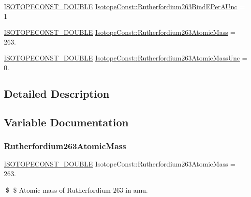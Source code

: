 \begin{DoxyCompactItemize}
\item 
\mbox{\hyperlink{group___isotope_const-_macros_ga8f45a7272ce02c0b4c65c44636ed719a}{I\+S\+O\+T\+O\+P\+E\+C\+O\+N\+S\+T\+\_\+\+D\+O\+U\+B\+LE}} \mbox{\hyperlink{group___isotope_const-_rutherfordium-_rf263_ga2b7370f06ca52f498ba7cba76658a5df}{Isotope\+Const\+::\+Rutherfordium263\+Bind\+E\+Per\+A\+Unc}} = 1
\item 
\mbox{\hyperlink{group___isotope_const-_macros_ga8f45a7272ce02c0b4c65c44636ed719a}{I\+S\+O\+T\+O\+P\+E\+C\+O\+N\+S\+T\+\_\+\+D\+O\+U\+B\+LE}} \mbox{\hyperlink{group___isotope_const-_rutherfordium-_rf263_ga6a90963a65b14347b4a79618be3d50c0}{Isotope\+Const\+::\+Rutherfordium263\+Atomic\+Mass}} = 263.
\item 
\mbox{\hyperlink{group___isotope_const-_macros_ga8f45a7272ce02c0b4c65c44636ed719a}{I\+S\+O\+T\+O\+P\+E\+C\+O\+N\+S\+T\+\_\+\+D\+O\+U\+B\+LE}} \mbox{\hyperlink{group___isotope_const-_rutherfordium-_rf263_ga54254646a83fdb500201ae9f2af0cd1a}{Isotope\+Const\+::\+Rutherfordium263\+Atomic\+Mass\+Unc}} = 0.
\end{DoxyCompactItemize}


\subsection{Detailed Description}


\subsection{Variable Documentation}
\mbox{\label{group___isotope_const-_rutherfordium-_rf263_ga6a90963a65b14347b4a79618be3d50c0}} 
\subsubsection{\texorpdfstring{Rutherfordium263\+Atomic\+Mass}{Rutherfordium263AtomicMass}}
{\footnotesize\ttfamily \mbox{\hyperlink{group___isotope_const-_macros_ga8f45a7272ce02c0b4c65c44636ed719a}{I\+S\+O\+T\+O\+P\+E\+C\+O\+N\+S\+T\+\_\+\+D\+O\+U\+B\+LE}} Isotope\+Const\+::\+Rutherfordium263\+Atomic\+Mass = 263.}

\$ \$ Atomic mass of Rutherfordium-\/263 in amu. \mbox{\label{group___isotope_const-_rutherfordium-_rf263_ga54254646a83fdb500201ae9f2af0cd1a}} 
